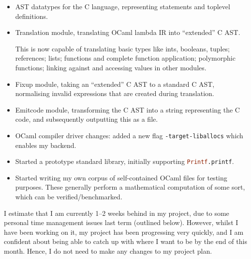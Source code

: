 \documentclass[12pt,twoside,a4paper]{article}
\begin{document}
\begin{itemize}
  \item AST datatypes for the C language, representing statements and toplevel definitions.

  \item
Translation module, translating OCaml lambda IR into ``extended'' C AST.

This is now capable of translating basic types like ints, booleans, tuples; references; lists; functions and complete function application; polymorphic functions; linking against and accessing values in other modules.

  \item
Fixup module, taking an ``extended'' C AST to a standard C AST, normalising invalid expressions that are created during translation.


  \item 
Emitcode module, transforming the C AST into a string representing the C code, and subsequently outputting this as a file.

  \item 
    OCaml compiler driver changes: added a new flag \lstinline{-target-liballocs} which enables my backend.

\item
  Started a prototype standard library, initially supporting \lstinline[language=ML]{Printf.printf}.

\item
Started writing my own corpus of self-contained OCaml files for testing purposes. These generally perform a mathematical computation of some sort, which can be verified/benchmarked.

\end{itemize}

I estimate that I am currently 1--2 weeks behind in my project, due to some personal time management issues last term (outlined below). However, whilst I have been working on it, my project has been progressing very quickly, and I am confident about being able to catch up with where I want to be by the end of this month. Hence, I do not need to make any changes to my project plan.
\end{document}

